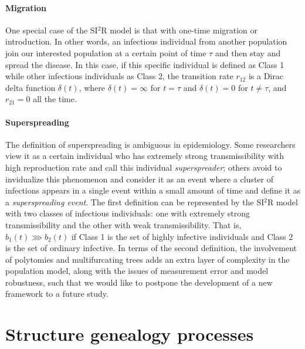 \documentclass[11pt,reqno,final]{amsart}\usepackage[]{graphicx}\usepackage[]{color}
\begin{document}
\paragraph{Migration}
One special case of the SI$^2$R model is that with one-time migration or introduction. In other words, an infectious individual from another population join our interested population at a certain point of time $\tau$ and then stay and spread the disease. In this case, if this specific individual is defined as Class 1 while other infectious individuals as Class 2, the transition rate $r_{12}$ is a Dirac delta function $\delta(t)$, where $\delta(t)=\infty$ for $t=\tau$ and $\delta(t)=0$ for $t\neq\tau$, and $r_{21}=0$ all the time.

\paragraph{Superspreading}
The definition of superspreading is ambiguous in epidemiology. Some researchers view it as a certain individual who has extremely strong transmissibility with high reproduction rate and call this individual \emph{superspreader}; others avoid to invidualize this phenomenon and consider it as an event where a cluster of infections appears in a single event within a small amount of time and define it as a \emph{superspreading event}. The first definition can be represented by the SI$^2$R model with two classes of infectious individuals: one with extremely strong transmissibility and the other with weak transmissibility. That is, $b_1(t)\ggg b_2(t)$ if Class 1 is the set of highly infective individuals and Class 2 is the set of ordinary infective. In terms of the second definition, the involvement of polytomies and multifurcating trees adds an extra layer of complexity in the population model, along with the issues of measurement error and model robustness, such that we would like to postpone the development of a new framework to a future study.

\section{Structure genealogy processes}
\end{document}
